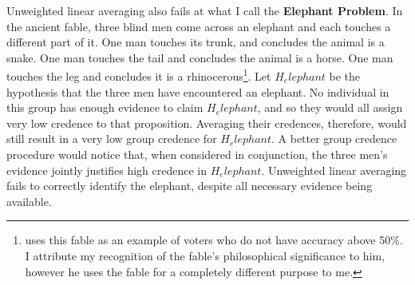\documentclass{article}
\begin{document}
Unweighted linear averaging also fails at what I call the \textbf{Elephant Problem}. In the ancient fable, three blind men come across an elephant and each touches a different part of it. One man touches its trunk, and concludes the animal is a snake. One man touches the tail and concludes the animal is a horse. One man touches the leg and concludes it is a rhinocerous\footnote{\citet[pg. 229]{estlund2009democratic} uses this fable as an example of voters who do not have accuracy above 50\%. I attribute my recognition of the fable's philosophical significance to him, however he uses the fable for a completely different purpose to me.}. Let \(H_elephant\) be the hypothesis that the three men have encountered an elephant. No individual in this group has enough evidence to claim \(H_elephant\), and so they would all assign very low credence to that proposition. Averaging their credences, therefore, would still result in a very low group credence for \(H_elephant\). A better group credence procedure would notice that, when considered in conjunction, the three men's evidence jointly justifies high credence in \(H_elephant\). Unweighted linear averaging fails to correctly identify the elephant, despite all necessary evidence being available.




\end{document}
